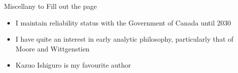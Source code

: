 \begin{rSection}{Miscellany to Fill out the page}

  \begin{itemize}
    \item I maintain reliability status with the Government of Canada until 2030
    \item I have quite an interest in early analytic philosophy, particularly that of Moore and Wittgenstien
    \item Kazuo Ishiguro is my favourite author
  \end{itemize}

\end{rSection}